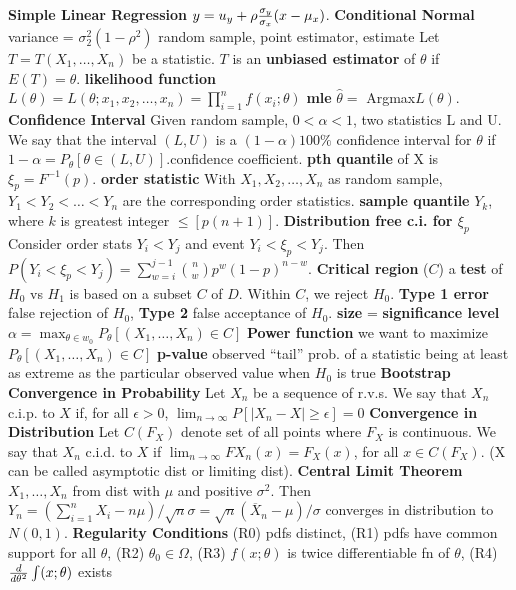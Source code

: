 {{\bf Simple Linear Regression} $y = u_y+\rho{\sigma_y \over \sigma_x}(x-\mu_x)$.\quad
{\bf Conditional Normal} variance = $\sigma_2^2(1-\rho^2)$\quad
random sample, point estimator, estimate\quad
Let $T=T(X_1,\dots,X_n)$ be a statistic.  $T$ is an {\bf unbiased estimator} of $\theta$ if $E(T)=\theta$.
{\bf likelihood function} $L(\theta) = L(\theta;x_1,x_2,\dots,x_n)=\prod_{i=1}^nf(x_i;\theta)$\quad
{\bf mle} $\hat\theta = $ Argmax$L(\theta)$.\quad
{\bf Confidence Interval} Given random sample, $0 < \alpha < 1$, two statistics L and U.  We say that the interval $(L,U)$ is a $(1-\alpha)100\%$ confidence interval for $\theta$ if $1-\alpha = P_\theta[\theta \in (L,U)]$.\quad confidence coefficient.\quad
{\bf pth quantile} of X is $\xi_p = F^{-1}(p)$.\quad
{\bf order statistic} With $X_1,X_2,\dots,X_n$ as random sample, $Y_1<Y_2<\dots<Y_n$ are the corresponding order statistics.\quad
{\bf sample quantile} $Y_k$, where $k$ is greatest integer $\leq [p (n+1)]$.\quad
{\bf Distribution free c.i. for $\xi_p$} Consider order stats $Y_i<Y_j$ and event $Y_i<\xi_p<Y_j$.  Then $P(Y_i<\xi_p<Y_j)=\sum_{w=i}^{j-1}{n \choose w}p^w(1-p)^{n-w}$.
{\bf Critical region} ($C$) a {\bf test} of $H_0$ vs $H_1$ is based on a subset $C$ of $D$. Within $C$, we reject $H_0$.\quad
{\bf Type 1 error } false rejection of $H_0$, {\bf Type 2} false acceptance of $H_0$.
{\bf size} = {\bf significance level} $\alpha = \max_{\theta \in w_0}{P_\theta[(X_1,\dots,X_n) \in C]}$\quad
{\bf Power function} we want to maximize $P_\theta[(X_1,\dots,X_n) \in C]$\quad
{\bf p-value} observed ``tail'' prob. of a statistic being at least as extreme as the particular observed value when $H_0$ is true\quad
{\bf Bootstrap} \quad
{\bf Convergence in Probability} Let ${X_n}$ be a sequence of r.v.s.  We say that $X_n$ c.i.p. to $X$ if, for all $\epsilon > 0$, $\lim_{n\rightarrow \infty}P[|X_n-X| \geq \epsilon] = 0$\quad
{\bf Convergence in Distribution} Let $C(F_X)$ denote set of all points where $F_X$ is continuous.  We say that $X_n$ c.i.d. to $X$ if $\lim_{n \rightarrow \infty}F{X_n}(x) = F_X(x)$, for all $x \in C(F_X)$. (X can be called asymptotic dist or limiting dist). \quad
{\bf Central Limit Theorem} $X_1,\dots,X_n$ from dist with $\mu$ and positive $\sigma^2$.  Then $Y_n=(\sum_{i=1}^{n}X_i-n\mu)/\sqrt{n}\sigma = \sqrt{n}(\overline X_n - \mu)/\sigma$ converges in distribution to $N(0,1)$.\quad
{\bf Regularity Conditions} (R0) pdfs distinct, (R1) pdfs have common support for all $\theta$, (R2) $\theta_0 \in \Omega$, (R3) $f(x;\theta)$ is twice differentiable fn of $\theta$, (R4) ${d \over d\theta^2}\int(x;\theta)$ exists\quad
}
